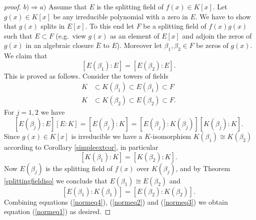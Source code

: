 \documentclass[]{scrartcl}
\newcommand{\<}{\trianglelefteq}
\begin{document}
\begin{itemize}
\begin{proof}[proof]
		$ b) \Rightarrow a) $ Assume that $ E $ is the splitting field of $ f(x) \in K[x] $. Let $ g(x) \in K[x] $ be any irreducible polynomial 
		with a zero in $ E $. We have to show that $ g(x) $ splits in $ E[x] $. To this end let $ F $ be a splitting field of $ f(x) g(x) $ 
		such that $ E \subset F $ (e.g.~view 
		$g(x)$ as an element of $E[x]$ and adjoin the zeros of
		$g(x)$ in an algebraic closure $\bar E$ to $E$). Moreover let $ \beta_1,
		\beta_2 \in F $ be zeros of $ g(x) $. We claim that 
		\begin{equation} \label{normeq1}
		[E(\beta_1): E] = [E(\beta_2): E]. 
		\end{equation}
		This is proved as follows. Consider the towers of fields 
		\begin{align*}
		K &\subset K(\beta_1) \subset E(\beta_1) \subset F \\
		K &\subset K(\beta_2) \subset E(\beta_2) \subset F.  
		\end{align*}
		For $ j = 1,2 $ we have 
		\begin{equation} \label{normeq2}
		[E(\beta_j): E][E: K] = [E(\beta_j): K] = [E(\beta_j): K(\beta_j)][K(\beta_j): K].
		\end{equation}
		Since $ g(x) \in K[x] $ is irreducible we have a $ K
		$-isomorphism $ K(\beta_1) \cong K(\beta_2) $ according
		to Corollary \ref{simpleextcor}, in particular 
		\begin{equation} \label{normeq3}
		[K(\beta_1): K] = [K(\beta_2): K]. 
		\end{equation}
		Now $ E(\beta_j) $ is the splitting field of $ f(x) $
		over $ K(\beta_j) $, and by Theorem \ref{splittingfieldiso} we conclude that 
		$ E(\beta_1) \cong E(\beta_2) $ and 
		\begin{equation} \label{normeq4}
		[E(\beta_1): K(\beta_1)] = [E(\beta_2): K(\beta_2)]. 
		\end{equation}
		Combining equations (\ref{normeq4}), (\ref{normeq2}) and (\ref{normeq3}) we obtain equation (\ref{normeq1}) as desired. 
		

\end{proof}
\end{itemize}
\end{document}
